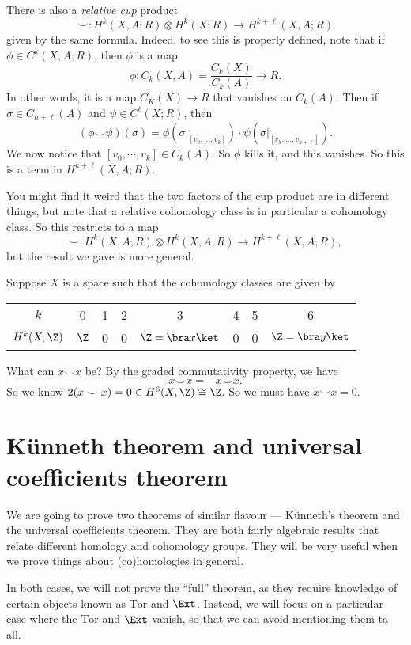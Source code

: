 \documentclass[a4paper]{article}
\begin{document}
There is also a \emph{relative cup} product
\[
  \smile: H^k(X, A; R) \otimes H^k(X; R) \to H^{k + \ell}(X, A; R)
\]
given by the same formula. Indeed, to see this is properly defined, note that if $\phi \in C^k(X, A; R)$, then $\phi$ is a map
\[
  \phi:C_k(X, A) = \frac{C_k(X)}{C_k(A)} \to R.
\]
In other words, it is a map $C_K(X) \to R$ that vanishes on $C_k(A)$. Then if $\sigma \in C_{n + \ell}(A)$ and $\psi \in C^\ell(X; R)$, then
\[
  (\phi \smile \psi)(\sigma) = \phi(\sigma|_{[v_0, \ldots, v_k]}) \cdot \psi(\sigma|_{[v_k, \ldots, v_{k + \ell}]}).
\]
We now notice that $[v_0, \cdots, v_k] \in C_k(A)$. So $\phi$ kills it, and this vanishes. So this is a term in $H^{k + \ell}(X, A; R)$.

You might find it weird that the two factors of the cup product are in different things, but note that a relative cohomology class is in particular a cohomology class. So this restricts to a map
\[
  \smile: H^k(X, A; R) \otimes H^k(X, A, R) \to H^{k + \ell}(X, A; R),
\]
but the result we gave is more general.

\begin{eg}
  Suppose $X$ is a space such that the cohomology classes are given by
  \begin{center}
    \begin{tabular}{cccccccc}
      $k$ & 0 & 1 & 2 & 3 & 4 & 5 & 6\\
      $H^k(X, \Z)$ & $\Z$ & 0 & 0 & $\Z = \bra x\ket$ & 0 & 0 & $\Z = \bra y\ket$
    \end{tabular}
  \end{center}
  What can $x \smile x$ be? By the graded commutativity property, we have
  \[
    x\smile x = - x \smile x.
  \]
  So we know $2(x \smile x) = 0 \in H^6(X, \Z) \cong \Z$. So we must have $x \smile x = 0$.
\end{eg}

\section{\texorpdfstring{K\"unneth}{Kunneth} theorem and universal coefficients theorem}
We are going to prove two theorems of similar flavour --- K\"unneth's theorem and the universal coefficients theorem. They are both fairly algebraic results that relate different homology and cohomology groups. They will be very useful when we prove things about (co)homologies in general.

In both cases, we will not prove the ``full'' theorem, as they require knowledge of certain objects known as $\mathrm{Tor}$ and $\Ext$. Instead, we will focus on a particular case where the $\mathrm{Tor}$ and $\Ext$ vanish, so that we can avoid mentioning them ta all.
\end{document}
